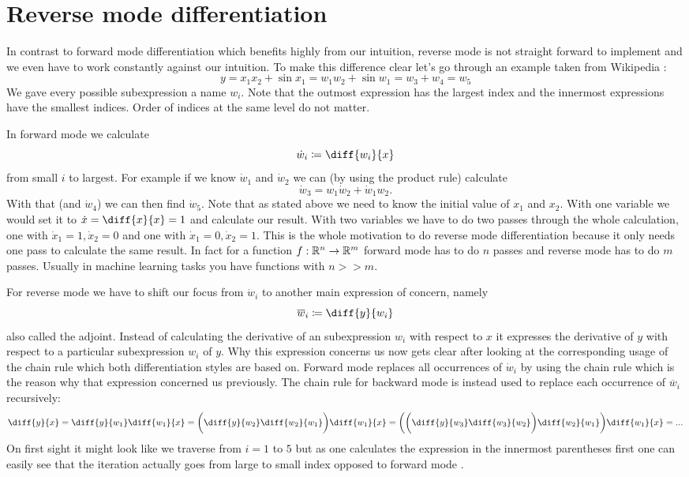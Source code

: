 \section{Reverse mode differentiation}

In contrast to forward mode differentiation which benefits highly from our intuition, reverse mode is not straight forward to implement and we even have to work constantly against our intuition. To make this difference clear let's go through an example taken from Wikipedia \cite{forwardAccumulationWiki}: 
\newcommand{\yExampleDiff}{y = x_1x_2 + \sin{x_1} = w_1w_2 + \sin{w_1} = w_3 + w_4 = w_5}
\[ \yExampleDiff \]
We gave every possible subexpression a name $w_i$. Note that the outmost expression has the largest index and the innermost expressions have the smallest indices. Order of indices at the same level do not matter.

In forward mode we calculate 
\[ \dot w_i \coloneqq \diff{w_i}{x} \]
from small $i$ to largest. For example if we know $\dot w_1$ and $\dot w_2$ we can (by using the product rule) calculate 
\[ \dot w_3 = w_1 \dot w_2 + \dot w_1 w_2. \]
With that (and $\dot w_4$) we can then find $\dot w_5$. Note that as stated above we need to know the initial value of $x_1$ and $x_2$. With one variable we would set it to $\dot x = \diff{x}{x} = 1$ and calculate our result. With two variables we have to do two passes through the whole calculation, one with $\dot x_1 = 1, \dot x_2 = 0$ and one with $\dot x_1 = 0, \dot x_2 = 1$. This is the whole motivation to do reverse mode differentiation because it only needs one pass to calculate the same result. In fact for a function $f: \mathbb{R}^n \to \mathbb{R}^m$ forward mode has to do $n$ passes and reverse mode has to do $m$ passes. Usually in machine learning tasks you have functions with $n >\! \!> m$.

\newcommand{\overw}[1]{\overline{w}_#1}
\newcommand{\diffyw}[1]{\diff{y}{w_#1}}
For reverse mode we have to shift our focus from $\dot w_i$ to another main expression of concern, namely 
\[ \overw{i} \coloneqq \diffyw{i} \]
also called the adjoint. Instead of calculating the derivative of an subexpression $w_i$ with respect to $x$ it expresses the derivative of $y$ with respect to a particular subexpression $w_i$ of $y$. Why this expression concerns us now gets clear after looking at the corresponding usage of the chain rule  which both differentiation styles are based on. Forward mode replaces all occurrences of $\dot w_i$ by using the chain rule which is the reason why that expression concerned us previously. The chain rule for backward mode is instead used to replace each occurrence of $\overw{i}$ recursively:
\newcommand{\diffw}[2]{\diff{w_#1}{w_#2}}
\[ \diff{y}{x} = \diffyw{1}\diff{w_1}{x} = \bigg(\diffyw{2}\diffw{2}{1}\bigg)\diff{w_1}{x} = \bigg(\bigg(\diffyw{3}\diffw{3}{2}\bigg)\diffw{2}{1}\bigg)\diff{w_1}{x} = ... \]
On first sight it might look like we traverse from $i = 1$ to $5$ but as one calculates the expression in the innermost parentheses first one can easily see that the iteration actually goes from large to small index opposed to forward mode \todogrammar. 

